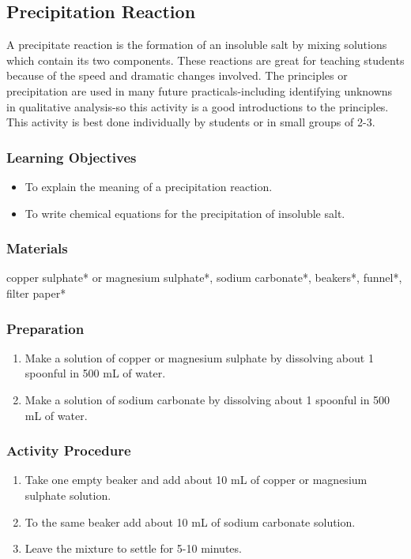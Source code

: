 \subsection{Precipitation Reaction}
A precipitate reaction is the formation of an insoluble salt by mixing solutions which contain its two components. These reactions are great for teaching students because of the speed and dramatic changes involved. The principles or precipitation are used in many future practicals-including identifying unknowns in qualitative analysis-so this activity is a good introductions to the principles. This activity is best done individually by students or in small groups of 2-3. 

\subsubsection*{Learning Objectives}
\begin{itemize}
\item{To explain the meaning of a precipitation reaction.}
\item{To write chemical equations for the precipitation of insoluble salt.}
\end{itemize}

\subsubsection*{Materials}
copper sulphate* or magnesium sulphate*, sodium carbonate*, beakers*, funnel*, filter paper*

\subsubsection*{Preparation}
\begin{enumerate}
\item{Make a solution of copper or magnesium sulphate by dissolving about 1 spoonful in 500 mL of water.}
\item{Make a solution of sodium carbonate by dissolving about 1 spoonful in 500 mL of water.}
\end{enumerate}

\subsubsection*{Activity Procedure}
\begin{enumerate}
\item{Take one empty beaker and add about 10 mL of copper or magnesium sulphate solution.}
\item{To the same beaker add about 10 mL of sodium carbonate solution.}
\item{Leave the mixture to settle for 5-10 minutes.}
\end{enumerate}

